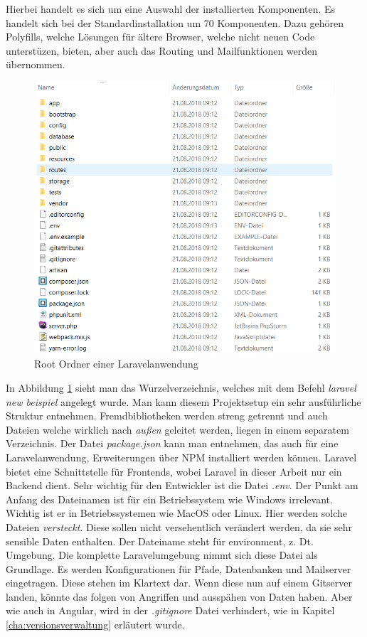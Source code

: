 Hierbei handelt es sich um eine Auswahl der installierten Komponenten. Es handelt sich bei der Standardinstallation um 70 Komponenten. Dazu gehören Polyfills, welche Lösungen für ältere Browser, welche nicht neuen Code unterstüzen, bieten, aber auch das Routing und Mailfunktionen werden übernommen.

\begin{figure}[H]
	\centering
	\includegraphics[scale=0.9]{content/pictures/laravelfolder.png}
	\caption{Root Ordner einer Laravelanwendung}
	\label{fig:laravelfolder}
\end{figure}

In Abbildung \ref{fig:laravelfolder} sieht man das Wurzelverzeichnis, welches mit dem Befehl \textit{laravel new beispiel} angelegt wurde. Man kann diesem Projektsetup ein sehr ausführliche Struktur entnehmen. Fremdbibliotheken werden streng getrennt und auch Dateien welche wirklich nach \textit{außen} geleitet werden, liegen in einem separatem Verzeichnis. Der Datei \textit{package.json} kann man entnehmen, das auch für eine Laravelanwendung, Erweiterungen über \ac{NPM} installiert werden können. Laravel bietet eine Schnittstelle für Frontends, wobei Laravel in dieser Arbeit nur ein Backend dient. Sehr wichtig für den Entwickler ist die Datei \textit{.env}. Der Punkt am Anfang des Dateinamen ist für ein Betriebssystem wie Windows irrelevant. Wichtig ist er in Betriebssystemen wie MacOS oder Linux. Hier werden solche Dateien \textit{versteckt}. Diese sollen nicht versehentlich verändert werden, da sie sehr sensible Daten enthalten. Der Dateiname steht für environment, \ac{z. Dt.} Umgebung. Die komplette Laravelumgebung nimmt sich diese Datei als Grundlage. Es werden Konfigurationen für Pfade, Datenbanken und Mailserver eingetragen. Diese stehen im Klartext dar. \autocite{Laravel.2018} Wenn diese nun auf einem Gitserver landen, könnte das folgen von Angriffen und ausspähen von Daten haben. Aber wie auch in Angular, wird in der \textit{.gitignore} Datei verhindert, wie in Kapitel \ref{cha:versionsverwaltung} erläutert wurde.


